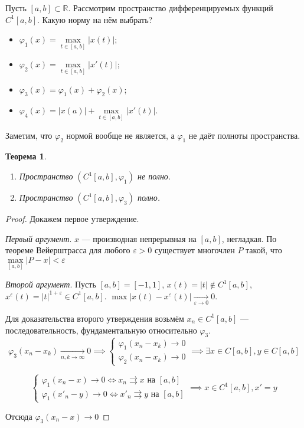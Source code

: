 \documentclass[11pt,openany,a4paper]{scrartcl}
\theoremstyle{plain}
\newtheorem{theorem}{Теорема}[section]
\theoremstyle{definition}
\newcommand\mb{\mathbb}
\newcommand\real{\mb R}
\newcommand{\uto}{\rightrightarrows}
\newcommand{\underto}[1]{\xrightarrow[#1]{}}
\begin{document}
Пусть $[a, b] \subset \real$.
Рассмотрим пространство дифференцируемых функций $C^1[a, b]$.
Какую норму на нём выбрать?
\begin{itemize}
    \item $\varphi_1(x) = \max\limits_{t \in [a, b]} |x(t)|$;
    \item $\varphi_2(x) = \max\limits_{t \in [a, b]} |x'(t)|$;
    \item $\varphi_3(x) = \varphi_1(x) + \varphi_2(x)$;
    \item $\varphi_4(x) = |x(a)| + \max\limits_{t \in [a, b]} |x'(t)|$.
\end{itemize}

Заметим, что $\varphi_2$ нормой вообще не является, а $\varphi_1$ не даёт полноты
пространства.
\pagebreak
\begin{theorem}
    \begin{enumerate}
        \item Пространство $(C^1 [a, b], \varphi_1)$ не полно.
        \item Пространство $(C^1 [a, b], \varphi_3)$ полно.
    \end{enumerate}
\end{theorem}

\begin{proof}
    Докажем первое утверждение.

    \emph{Первый аргумент}. $x$ — производная непрерывная на $[a, b]$, негладкая.
        По теореме Вейерштрасса для любого $\varepsilon > 0$ существует многочлен
        $P$ такой, что $\max\limits_{[a, b]} |P - x| < \varepsilon$

    \emph{Второй аргумент}. Пусть $[a, b] = [-1, 1]$, $x(t) = |t| \notin C^1[a, b]$,
    $x^\varepsilon(t) = |t|^{1 + \varepsilon} \in C^1[a, b]$. $\max |x(t) - x^\varepsilon(t)| 
    \underto{\varepsilon \to 0} 0$.

    Для доказательства второго утверждения возьмём $x_n \in C^1[a, b]$ —
    последовательность, фундаментальную относительно $\varphi_3$.
    $$
    \varphi_3(x_n -x_k) \underto{n, k \to \infty} 0 \implies
    \begin{cases}
        \varphi_1(x_n - x_k) \to 0\\
        \varphi_2(x_n - x_k) \to 0
    \end{cases}
    \implies \exists x \in C[a, b], y \in C[a, b]
    $$

    $$
    \begin{cases}
        \varphi_1(x_n - x) \to 0 \iff x_n \uto x \text{ на } [a, b]\\
        \varphi_1(x'_n - y) \to 0 \iff x'_n \uto y \text{ на } [a, b]
    \end{cases}
    \implies x \in C^1[a, b], x' = y
    $$

    Отсюда $\varphi_3(x_n - x) \to 0$
\end{proof}
\end{document}
